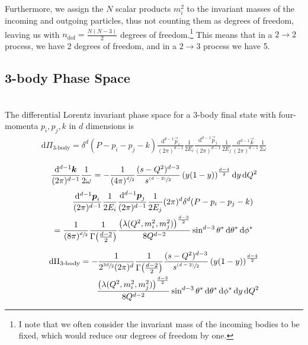     Furthermore, we assign the \(N\) scalar products \(m^2_i\) to the invariant masses of the incoming and outgoing particles, thus not counting them as degrees of freedom, leaving us with
    \(n_\text{dof} = \frac{N(N-3)}{2}\) degrees of freedom.\footnote{I note that we often consider the invariant mass of the incoming bodies to be fixed, which would reduce our degrees of freedom by one.}
    This means that in a \(2\to 2\) process, we have 2 degrees of freedom, and in a \(2\to 3\) process we have 5.


    \subsection{3-body Phase Space}
        \\
        The differential Lorentz invariant phase space for a 3-body final state with four-momenta \(p_i, p_j, k\) in \(d\) dimensions is
        \begin{align}
            \mathrm{d}\Pi_\text{3-body} = \delta^d(P - p_i - p_j - k) \frac{\mathrm{d}^{d-1} \vec{p}_i}{(2\pi)^{d-1}} \frac{1}{2E_i} \frac{\mathrm{d}^{d-1} \vec{p}_j}{(2\pi)^{d-1}} \frac{1}{2E_j} \frac{\mathrm{d}^{d-1} \vec{k}}{(2\pi)^{d-1}} \frac{1}{2\omega}
        \end{align}



        \begin{align}
            \frac{\mathrm{d}^{d-1}\boldsymbol{k}}{(2\pi)^{d-1}} \frac{1}{2\omega} = -\frac{1}{(4\pi)^{\sfrac{d}{2}}} \frac{(s-Q^2)^{d-3}}{s^{\sfrac{(d-2)}{2}}} \left(y(1-y)\right)^{\frac{d-4}{2}} \mathrm{d}y \, \mathrm{d}Q^2
        \end{align}
        \begin{align}
            \frac{\mathrm{d}^{d-1} \boldsymbol{p}_i}{(2\pi)^{d-1}} \frac{1}{2E_i} \frac{\mathrm{d}^{d-1} \boldsymbol{p}_j}{(2\pi)^{d-1}} \frac{1}{2E_j} (2\pi)^d \delta^d(P - p_i - p_j - k) \\
            = \frac{1}{(8\pi)^{\sfrac{d}{2}}} \frac{1}{\Gamma\!\left(\frac{d-2}{2}\right)} \frac{\left(\lambda(Q^2, m_i^2, m_j^2)\right)^{\frac{d-3}{2}}}{8 Q^{d-2}} \sin^{d-3}\theta^\ast \,\mathrm{d}\theta^\ast \, \mathrm{d}\phi^\ast
        \end{align}

        \begin{align}
            \mathrm{d}\Pi_\text{3-body} = -\frac{1}{2^{\sfrac{3d}{2}} (2\pi)^d} \frac{1}{\Gamma\!\left(\frac{d-2}{2}\right)} \frac{(s-Q^2)^{d-3}}{s^{\sfrac{(d-2)}{2}}} \left(y(1-y)\right)^{\frac{d-4}{2}} \\
            \frac{\left(\lambda(Q^2, m_i^2, m_j^2)\right)^{\frac{d-3}{2}}}{8 Q^{d-2}} \sin^{d-3}\theta^\ast \,\mathrm{d}\theta^\ast \, \mathrm{d}\phi^\ast \, \mathrm{d}y \, \mathrm{d}Q^2
        \end{align}

